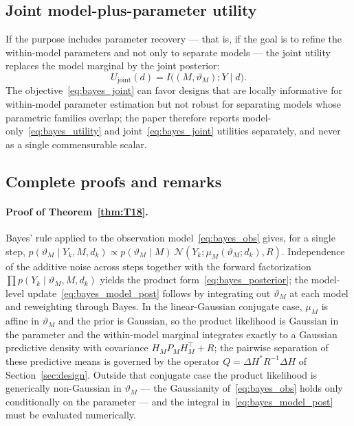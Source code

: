 \subsection{Joint model-plus-parameter utility}

If the purpose includes parameter recovery --- that is, if the goal is to refine the within-model parameters and not only to separate models --- the joint utility replaces the model marginal by the joint posterior:
\begin{equation}
U_{\mathrm{joint}}(d) = I\bigl((M,\vartheta_M); Y \mid d\bigr).
\label{eq:bayes_joint}
\end{equation}
The objective~\eqref{eq:bayes_joint} can favor designs that are locally informative for within-model parameter estimation but not robust for separating models whose parametric families overlap; the paper therefore reports model-only~\eqref{eq:bayes_utility} and joint~\eqref{eq:bayes_joint} utilities separately, and never as a single commensurable scalar.

\subsection{Complete proofs and remarks}
\paragraph{Proof of Theorem~\ref{thm:T18}.}
Bayes' rule applied to the observation model~\eqref{eq:bayes_obs} gives, for a single step, $p(\vartheta_M \mid Y_k, M, d_k) \propto p(\vartheta_M \mid M)\, \mathcal{N}(Y_k; \mu_M(\vartheta_M; d_k), R)$. Independence of the additive noise across steps together with the forward factorization $\prod p(Y_k \mid \vartheta_M, M, d_k)$ yields the product form~\eqref{eq:bayes_posterior}; the model-level update~\eqref{eq:bayes_model_post} follows by integrating out $\vartheta_M$ at each model and reweighting through Bayes. In the linear-Gaussian conjugate case, $\mu_M$ is affine in $\vartheta_M$ and the prior is Gaussian, so the product likelihood is Gaussian in the parameter and the within-model marginal integrates exactly to a Gaussian predictive density with covariance $H_{M} P_{M} H_{M}^{\top} + R$; the pairwise separation of these predictive means is governed by the operator $Q = \Delta H^{*} R^{-1} \Delta H$ of Section~\ref{sec:design}. Outside that conjugate case the product likelihood is generically non-Gaussian in $\vartheta_M$ --- the Gaussianity of~\eqref{eq:bayes_obs} holds only conditionally on the parameter --- and the integral in~\eqref{eq:bayes_model_post} must be evaluated numerically.

